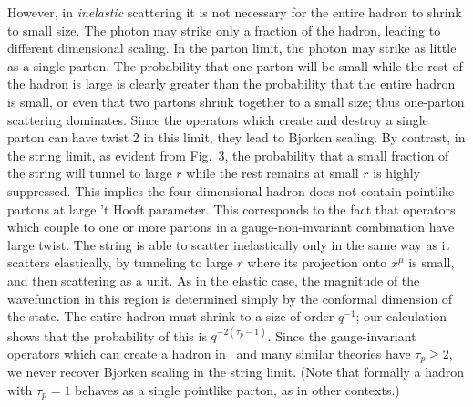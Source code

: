 However, in {\it inelastic} scattering it is not necessary for the entire hadron to shrink to small size.
The photon may strike only a fraction of the hadron, leading to different dimensional scaling.
In the parton limit, the photon may strike as little as
a single parton.  The probability that one parton will be small while the rest of the hadron is large
is clearly greater than the probability that the entire hadron is small, or even that two partons shrink
together to a small size; thus one-parton scattering
dominates.  Since the operators which create and destroy a single parton can have twist 2 in this limit,
they lead to Bjorken scaling.  By contrast, in the string limit, as evident from Fig.~3, the probability
that a small fraction of the string will tunnel to large $r$ while the rest remains at small $r$ is highly
suppressed.  This implies the four-dimensional hadron  
does not contain pointlike partons at large 't Hooft parameter.  
This corresponds to the fact that operators which couple to one or more partons in
a gauge-non-invariant combination have large twist.  The string is 
able to scatter
inelastically only in the same way as it scatters elastically, 
by tunneling to large $r$ where its projection onto $x^\mu$ is
small, and then scattering as a unit.  As in the elastic case,
the magnitude of the wavefunction in this region is
determined simply by the conformal dimension of the state. 
The entire hadron must shrink to a size 
of order $q^{-1}$; our calculation
shows that the probability of this is
$q^{-2(\tau_p - 1)}$.  Since the gauge-invariant operators which can create
a hadron in \nonestar\ and many similar theories have $\tau_p\geq 2$, 
we never recover
Bjorken scaling in the string limit.  (Note that formally a hadron with $\tau_p = 1$
behaves as a single pointlike parton, as in other contexts.)


